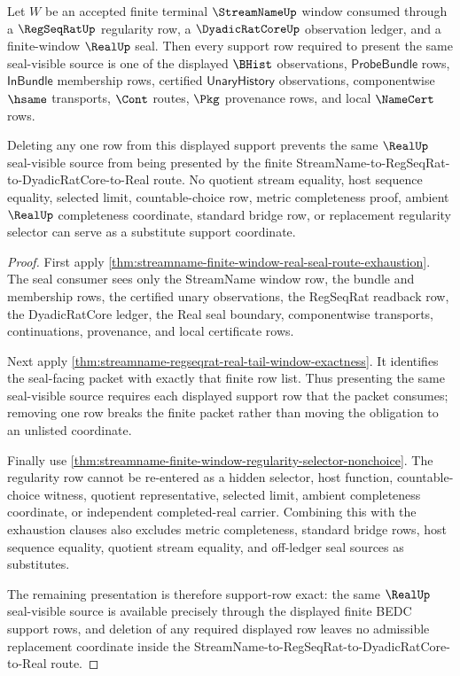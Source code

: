 \begin{theorem}
\label{thm:streamname-real-terminal-support-minimality}
Let $W$ be an accepted finite terminal $\StreamNameUp$ window consumed through a $\RegSeqRatUp$ regularity row, a $\DyadicRatCoreUp$ observation ledger, and a finite-window $\RealUp$ seal. Then every support row required to present the same seal-visible source is one of the displayed $\BHist$ observations, $\mathsf{ProbeBundle}$ rows, $\mathsf{InBundle}$ membership rows, certified $\mathsf{UnaryHistory}$ observations, componentwise $\hsame$ transports, $\Cont$ routes, $\Pkg$ provenance rows, and local $\NameCert$ rows.

Deleting any one row from this displayed support prevents the same $\RealUp$ seal-visible source from being presented by the finite StreamName-to-RegSeqRat-to-DyadicRatCore-to-Real route. No quotient stream equality, host sequence equality, selected limit, countable-choice row, metric completeness proof, ambient $\RealUp$ completeness coordinate, standard bridge row, or replacement regularity selector can serve as a substitute support coordinate.
\end{theorem}
\begin{proof}
First apply \autoref{thm:streamname-finite-window-real-seal-route-exhaustion}. The seal consumer sees only the StreamName window row, the bundle and membership rows, the certified unary observations, the RegSeqRat readback row, the DyadicRatCore ledger, the Real seal boundary, componentwise transports, continuations, provenance, and local certificate rows.

Next apply \autoref{thm:streamname-regseqrat-real-tail-window-exactness}. It identifies the seal-facing packet with exactly that finite row list. Thus presenting the same seal-visible source requires each displayed support row that the packet consumes; removing one row breaks the finite packet rather than moving the obligation to an unlisted coordinate.

Finally use \autoref{thm:streamname-finite-window-regularity-selector-nonchoice}. The regularity row cannot be re-entered as a hidden selector, host function, countable-choice witness, quotient representative, selected limit, ambient completeness coordinate, or independent completed-real carrier. Combining this with the exhaustion clauses also excludes metric completeness, standard bridge rows, host sequence equality, quotient stream equality, and off-ledger seal sources as substitutes.

The remaining presentation is therefore support-row exact: the same $\RealUp$ seal-visible source is available precisely through the displayed finite BEDC support rows, and deletion of any required displayed row leaves no admissible replacement coordinate inside the StreamName-to-RegSeqRat-to-DyadicRatCore-to-Real route.
\end{proof}

